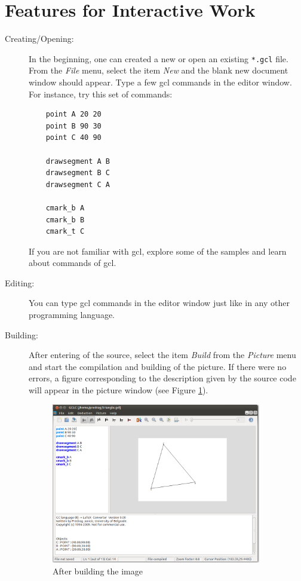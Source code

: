 \documentclass[a4paper]{book}
\begin{document}
\section{Features for Interactive Work}


\begin{description}
\item[Creating/Opening:] In the beginning, one can created a new or open an 
existing \verb|*.gcl| file. From the {\it File} menu, select the item 
{\it New} and the blank new document window should appear. Type a few 
{\sc gcl} commands in the editor window. For instance, try this set of commands:

\begin{verbatim}
    point A 20 20
    point B 90 30
    point C 40 90

    drawsegment A B
    drawsegment B C
    drawsegment C A

    cmark_b A
    cmark_b B
    cmark_t C
\end{verbatim}

If you are not familiar with {\sc gcl}, explore some of the samples
and learn about commands of {\sc gcl}.

\item[Editing:] You can type {\sc gcl} commands in the editor window just
like in any other programming language.

\item[Building:] After entering of the source, select the
item {\it Build} from the {\it Picture} menu and start the 
compilation and building of the picture.
If there were no errors, a figure corresponding to the description
given by the source code will appear in the picture window (see
Figure \ref{fig:building}).

\begin{figure}[h]
\begin{center}
\includegraphics[width=0.9\textwidth]{figures/freePoints1.png}
\end{center}
\caption{After building the image}
\label{fig:building}
\end{figure}



\end{description}
\end{document}
